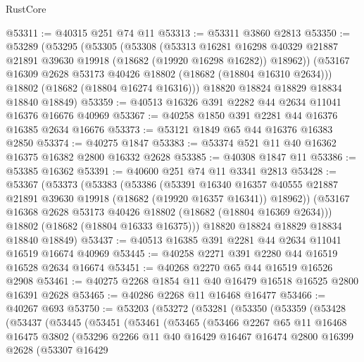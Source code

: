 \begin{lexlean}{RustCore}
\begin{coremodule}
@53311 := @40315 @251 @74 @11
@53313 := @53311 @3860 @2813
@53350 := @53289
    (@53295
      (@53305
        (@53308
          (@53313
            @16281
            @16298
            @40329
            @21887
            @21891
            @39630
            @19918
            (@18682 (@19920 @16298 @16282))
            @18962))
        (@53167 @16309 @2628 @53173 @40426 @18802 (@18682 (@18804 @16310 @2634)))
        @18802
        (@18682 (@18804 @16274 @16316)))
      @18820
      @18824
      @18829
      @18834
      @18840
      @18849)
@53359 := @40513 @16326 @391 @2282 @44 @2634 @11041 @16376 @16676 @40969
@53367 := @40258 @1850 @391 @2281 @44 @16376 @16385 @2634 @16676
@53373 := @53121 @1849 @65 @44 @16376 @16383 @2850
@53374 := @40275 @1847
@53383 := @53374 @521 @11 @40 @16362 @16375 @16382 @2800 @16332 @2628
@53385 := @40308 @1847 @11
@53386 := @53385 @16362
@53391 := @40600 @251 @74 @11 @3341 @2813
@53428 := @53367
    (@53373
      (@53383
        (@53386
          (@53391
            @16340
            @16357
            @40555
            @21887
            @21891
            @39630
            @19918
            (@18682 (@19920 @16357 @16341))
            @18962))
        (@53167 @16368 @2628 @53173 @40426 @18802 (@18682 (@18804 @16369 @2634)))
        @18802
        (@18682 (@18804 @16333 @16375)))
      @18820
      @18824
      @18829
      @18834
      @18840
      @18849)
@53437 := @40513 @16385 @391 @2281 @44 @2634 @11041 @16519 @16674 @40969
@53445 := @40258 @2271 @391 @2280 @44 @16519 @16528 @2634 @16674
@53451 := @40268 @2270 @65 @44 @16519 @16526 @2908
@53461 := @40275 @2268 @1854 @11 @40 @16479 @16518 @16525 @2800 @16391 @2628
@53465 := @40286 @2268 @11 @16468 @16477
@53466 := @40267 @693
@53750 := @53203
    (@53272
      (@53281
        (@53350
          (@53359
            (@53428
              (@53437
                (@53445
                  (@53451
                    (@53461
                      (@53465
                        (@53466
                          @2267
                          @65
                          @11
                          @16468
                          @16475
                          @3802
                          (@53296
                            @2266
                            @11
                            @40
                            @16429
                            @16467
                            @16474
                            @2800
                            @16399
                            @2628
                            (@53307
                              @16429

\end{coremodule}
\end{lexlean}
